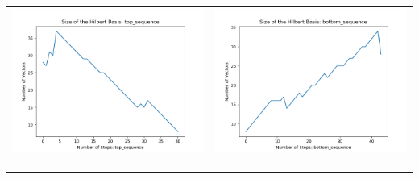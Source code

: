 \documentclass[10pt]{article}
\begin{document}
\begin{tabular}{c|c}
\begin{minipage}{.45\textwidth}
\includegraphics[width=\textwidth]{"DATA/4d/4 generators 2 bound G/top_sequence SIZE"}
\end{minipage} &
\begin{minipage}{.45\textwidth}
\includegraphics[width=\textwidth]{"DATA/4d/4 generators 2 bound G bottomup/bottom_sequence SIZE"}
\end{minipage} \\ \\
\hline \\\begin{minipage}{.45\textwidth}

\end{minipage}
\end{tabular}
\end{document}
